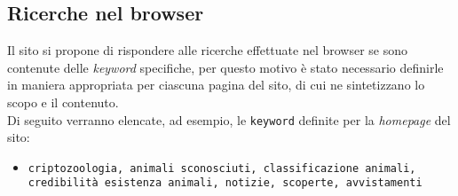 \subsection{Ricerche nel browser}
\label{subsec:ricerche-nel-browser}
Il sito si propone di rispondere alle ricerche effettuate nel browser se sono contenute delle \textit{keyword} specifiche, per questo motivo è stato necessario definirle in maniera appropriata per ciascuna pagina del sito, di cui ne sintetizzano lo scopo e il contenuto. \\
Di seguito verranno elencate, ad esempio, le \texttt{keyword} definite per la \textit{homepage} del sito:
\begin{itemize}
    \item \texttt{criptozoologia, animali sconosciuti, classificazione animali, credibilità esistenza animali, notizie, scoperte, avvistamenti}
\end{itemize}
